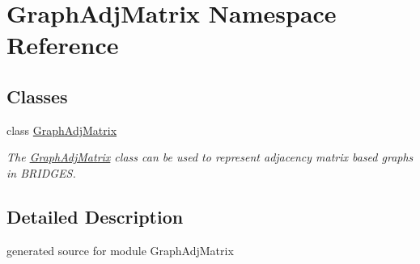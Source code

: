 \hypertarget{namespace_graph_adj_matrix}{}\section{Graph\+Adj\+Matrix Namespace Reference}
\label{namespace_graph_adj_matrix}
\subsection*{Classes}
\begin{DoxyCompactItemize}
\item 
class \hyperlink{class_graph_adj_matrix_1_1_graph_adj_matrix}{Graph\+Adj\+Matrix}
\begin{DoxyCompactList}\small\item\em The \hyperlink{class_graph_adj_matrix_1_1_graph_adj_matrix}{Graph\+Adj\+Matrix} class can be used to represent adjacency matrix based graphs in B\+R\+I\+D\+G\+ES. \end{DoxyCompactList}\end{DoxyCompactItemize}


\subsection{Detailed Description}
\begin{DoxyVerb}generated source for module GraphAdjMatrix \end{DoxyVerb}
 